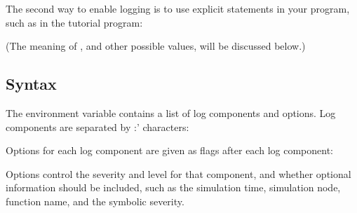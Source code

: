 \documentclass[letterpaper,10pt,english]{sphinxmanual}
\renewcommand{\sphinxcode}[1]{\texttt{\small{#1}}}
\begin{document}
The second way to enable logging is to use explicit statements in your
program, such as in the \sphinxcode{} tutorial program:

\begin{sphinxVerbatim}[commandchars=\\\{\}]
    \PYG{p}{[}\PYG{p}{]}
    
    
\end{sphinxVerbatim}

(The meaning of \sphinxcode{}, and other possible values,
will be discussed below.)


\subsection{ Syntax}
\label{\detokenize{logging:ns-log-syntax}}
The \sphinxcode{} environment variable contains a list of log components
and options.  Log components are separated by \textasciigrave{}:’ characters:

\begin{sphinxVerbatim}[commandchars=\\\{\}]
\PYGZdl{} 
\end{sphinxVerbatim}

Options for each log component are given as flags after
each log component:

\begin{sphinxVerbatim}[commandchars=\\\{\}]
\PYGZdl{} 
\end{sphinxVerbatim}

Options control the severity and level for that component,
and whether optional information should be included, such as the
simulation time, simulation node, function name, and the symbolic severity.
\end{document}
